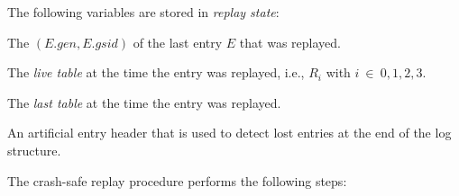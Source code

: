 \documentclass[12pt,a4paper,twoside]{book}
\begin{document}
The following variables are stored in \textit{replay state}:
\begin{description}[noitemsep,leftmargin=1.5cm,labelindent=1cm]
    \item[$\mathbf{(gen_{last}, gsid_{last})}$] The $(E.gen, E.gsid)$ of the last entry $E$ that was replayed.
    \item[Live Table] The \textit{live table} at the time the entry was replayed, i.e., $R_i$ with $i~\in~{0,1,2,3}$.
    \item[Last Table] The \textit{last table} at the time the entry was replayed.
    \item[$E_{seal}$] An artificial entry header that is used to detect lost entries at the end of the log structure.
\end{description}
The crash-safe replay procedure performs the following steps:
\end{document}
